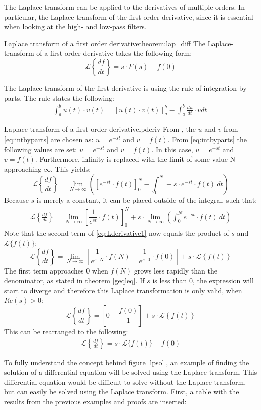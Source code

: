\noindent The Laplace transform can be applied to the derivatives of multiple orders. In particular, the Laplace transform of the first order derivative, since it is essential when looking at the high- and low-pass filters.
\begin{theorem}{Laplace transform of a first order derivative}{theorem:lap_diff}
The Laplace-transform of a first order derivative takes the following form:
$$\mathcal{L} \left\{\frac{df}{dt} \right\} = s \cdot F(s)-f(0)$$
\end{theorem}
\noindent The Laplace transform of the first derivative is using the rule of integration by parts. The rule states the following:
\begin{align}
\int_{a}^{b}{u(t) \cdot v(t)}=\left[u(t) \cdot v(t) \right]_{a}^{b}-\int_{a}^{b} \frac{du}{dt}\cdot v dt\
\label{eq:intbyparts}
\end{align}
\begin{prof}{Laplace transform of a first order derivative}{lpderiv}
From \Cref{lpdef}, the $u$ and $v$ from \eqref{eq:intbyparts} are chosen as: $u=e^{-st}$ and $v=f(t)$.
From \eqref{eq:intbyparts} the following values are set: $u=e^{-st}$ and $v=f(t)$.
In this case, $u=e^{-st}$ and $v=f(t)$. Furthermore, infinity is replaced with the limit of some value N approaching $\infty$. This yields:
$$\mathcal{L} \left\{\frac{df}{dt} \right\}=\lim_{N \to \infty} \left(\left[e^{-st}\cdot f(t)\right]_{0}^{N}-\int_{0}^{N} -s\cdot e^{-st}\cdot f(t)\ dt \right)$$
Because $s$ is merely a constant, it can be placed outside of the integral, such that:
\begin{align}
\mathcal{L} \left\{\frac{df}{dt} \right\}=\lim_{N \to \infty} \left[\dfrac{1}{e^{st}}\cdot f(t)\right]_{0}^{N}+ s \cdot \lim_{N \to \infty} \left( \int_{0}^{N}e^{-st}\cdot f(t)\ dt \right)\label{eq:Lderivative1}
\end{align}
Note that the second term of \eqref{eq:Lderivative1} now equals the product of $s$ and $\mathcal{L}\{f(t)\}$:
$$\mathcal{L} \left\{\frac{df}{dt} \right\} = \lim_{N \to \infty}\left[\dfrac{1}{e^{s\cdot N}}\cdot f(N)-\dfrac{1}{e^{s\cdot 0}}\cdot f(0)\right]+s\cdot \mathcal{L} \left\{f(t) \right\}$$
The first term approaches 0 when $f(N)$ grows less rapidly than the denominator, as stated in theorem \ref{geqleq}. If $s$ is less than 0, the expression will start to diverge and therefore this Laplace transformation is only valid, when $Re(s)>0$:
$$\mathcal{L} \left\{\frac{df}{dt} \right\} = \left[0-\dfrac{f(0)}{1}\right]+s\cdot \mathcal{L} \left\{f(t) \right\}$$
This can be rearranged to the following:
\begin{align*}
\mathcal{L} \left\{\frac{df}{dt} \right\} = s\cdot \mathcal{L}\{f(t)\}-f(0)
\end{align*}

\end{prof}
\noindent To fully understand the concept behind figure \ref{lpsol}, an example of finding the solution of a differential equation will be solved using the Laplace transform. This differential equation would be difficult to solve without the Laplace transform, but can easily be solved using the Laplace transform. First, a table with the results from the previous examples and proofs are inserted:


